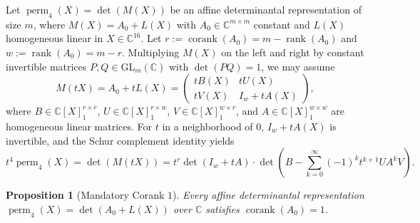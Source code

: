 \documentclass[11pt,a4paper]{article}
\newtheorem{proposition}[theorem]{Proposition}
\theoremstyle{definition}
\DeclareMathOperator{\perm}{perm}
\DeclareMathOperator{\rank}{rank}
\DeclareMathOperator{\corank}{corank}
\begin{document}
Let $\perm_4(X) = \det(M(X))$ be an affine determinantal representation of size $m$, where $M(X) = A_0 + L(X)$ with $A_0 \in \mathbb{C}^{m\times m}$ constant and $L(X)$ homogeneous linear in $X \in \mathbb{C}^{16}$. Let $r := \corank(A_0) = m - \rank(A_0)$ and $w := \rank(A_0) = m - r$. Multiplying $M(X)$ on the left and right by constant invertible matrices $P, Q \in \mathrm{GL}_m(\mathbb{C})$ with $\det(PQ) = 1$, we may assume
\begin{equation}\label{eq:blockM}
  M(tX) = A_0 + tL(X) = \begin{pmatrix} t B(X) & t U(X) \\ t V(X) & I_w + t A(X) \end{pmatrix},
\end{equation}
where $B \in \mathbb{C}[X]_1^{r\times r}$, $U \in \mathbb{C}[X]_1^{r\times w}$, $V \in \mathbb{C}[X]_1^{w\times r}$, and $A \in \mathbb{C}[X]_1^{w\times w}$ are homogeneous linear matrices. For $t$ in a neighborhood of $0$, $I_w + tA(X)$ is invertible, and the Schur complement identity yields
\begin{equation}\label{eq:schur}
  t^4 \perm_4(X) = \det(M(tX))
  = t^r \det(I_w + tA) \cdot \det\!\left(B - \sum_{k=0}^{\infty} (-1)^k t^{k+1} U A^k V\right).
\end{equation}

\begin{proposition}[Mandatory Corank $1$]\label{prop:corank1}
Every affine determinantal representation $\perm_4(X) = \det(A_0 + L(X))$ over $\mathbb{C}$ satisfies $\corank(A_0) = 1$.
\end{proposition}
\end{document}
